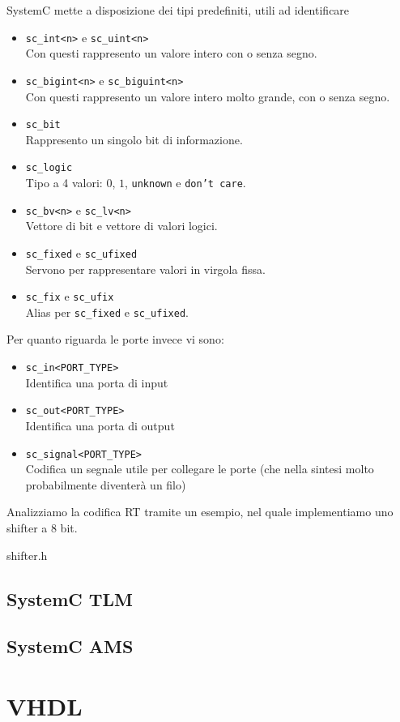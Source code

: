 \documentclass[10pt,a4paper,oneside]{scrbook}
\begin{document}
SystemC mette a disposizione dei tipi predefiniti, utili ad identificare 
\begin{itemize}
    \item \texttt{sc\_int<n>} e \texttt{sc\_uint<n>}\\
    Con questi rappresento un valore intero con o senza segno.
    \item \texttt{sc\_bigint<n>} e \texttt{sc\_biguint<n>}\\
    Con questi rappresento un valore intero molto grande, con o senza segno.
    \item \texttt{sc\_bit}\\
    Rappresento un singolo bit di informazione.
    \item \texttt{sc\_logic}\\
    Tipo a 4 valori: $0$, $1$, \texttt{unknown} e \texttt{don't care}.
    \item \texttt{sc\_bv<n>} e \texttt{sc\_lv<n>}\\
    Vettore di bit e vettore di valori logici.
    \item \texttt{sc\_fixed} e \texttt{sc\_ufixed}\\
    Servono per rappresentare valori in virgola fissa.
    \item \texttt{sc\_fix} e \texttt{sc\_ufix}\\
    Alias per \texttt{sc\_fixed} e \texttt{sc\_ufixed}.
\end{itemize}
Per quanto riguarda le porte invece vi sono:
\begin{itemize}
    \item \texttt{sc\_in<PORT\_TYPE>}\\
    Identifica una porta di input
    \item \texttt{sc\_out<PORT\_TYPE>}\\
    Identifica una porta di output
    \item \texttt{sc\_signal<PORT\_TYPE>}\\
    Codifica un segnale utile per collegare le porte (che nella sintesi molto probabilmente diventerà un filo)
\end{itemize}

Analizziamo la codifica RT tramite un esempio, nel quale implementiamo uno shifter a 8 bit.
\begin{systemc}{shifter.h}

\end{systemc}
\section{SystemC TLM}
\section{SystemC AMS}
\chapter{VHDL}
\end{document}
